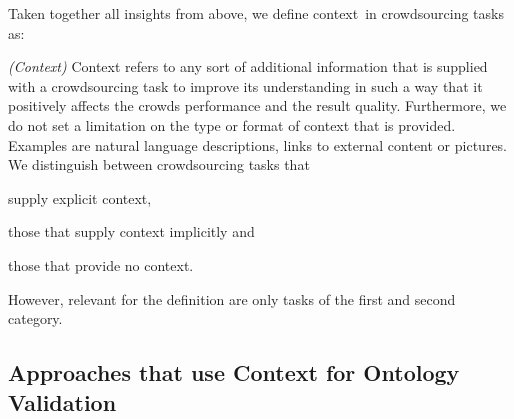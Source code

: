 Taken together all insights from above, we define \guillemotright context\guillemotleft~in crowdsourcing tasks as:

\begin{defn}
	\emph{(Context)} Context refers to any sort of additional information that is supplied with a crowdsourcing task to improve its understanding in
	such a way that it positively affects the crowds performance and the result quality. Furthermore, we do not set a limitation on the type or format 
	of context that is provided. Examples are natural language descriptions, links to external content or pictures. We distinguish between
	crowdsourcing tasks that
	\begin{inparaenum}[1)]
			\item supply explicit context,
			\item those that supply context implicitly and
			\item those that provide no context.
	\end{inparaenum}
	However, relevant for the definition are only tasks of the first and second category. 
\end{defn}



\subsection{Approaches that use Context for Ontology Validation}
